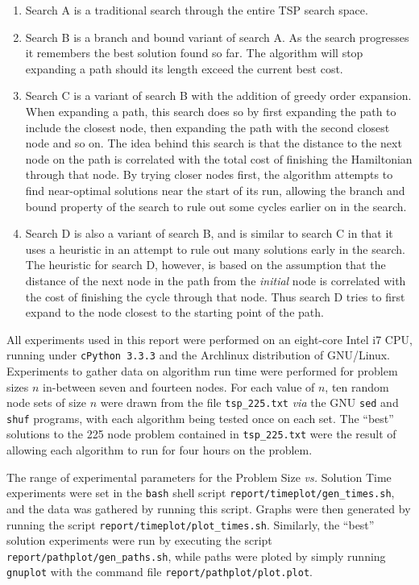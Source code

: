 \documentclass{article}
\begin{document}
\begin{enumerate}
	\item Search A is a traditional search through the entire TSP search space.
	\item Search B is a branch and bound variant of search A. As the search progresses it remembers the best solution found so far. The algorithm will stop expanding a path should its length exceed the current best cost.
	\item Search C is a variant of search B with the addition of greedy order expansion. When expanding a path, this search does so by first expanding the path to include the closest node, then expanding the path with the second closest node and so on. The idea behind this search is that the distance to the next node on the path is correlated with the total cost of finishing the Hamiltonian through that node. By trying closer nodes first, the algorithm attempts to find near-optimal solutions near the start of its run, allowing the branch and bound property of the search to rule out some cycles earlier on in the search.
	\item Search D is also a variant of search B, and is similar to search C in that it uses a heuristic in an attempt to rule out many solutions early in the search. The heuristic for search D, however, is based on the assumption that the distance of the next node in the path from the {\it initial} node is correlated with the cost of finishing the cycle through that node. Thus search D tries to first expand to the node closest to the starting point of the path.
\end{enumerate}


All experiments used in this report were performed on an eight-core Intel i7 CPU, running under {\tt cPython 3.3.3} and the Archlinux distribution of GNU/Linux. \\

Experiments to gather data on algorithm run time were performed for problem sizes \(n\) in-between seven and fourteen nodes. For each value of \(n\), ten random node sets of size \(n\) were drawn from the file {\tt tsp\_225.txt} {\it via} the GNU {\tt sed} and {\tt shuf} programs, with each algorithm being tested once on each set.  The ``best'' solutions to the 225 node problem contained in {\tt tsp\_225.txt} were the result of allowing each algorithm to run for four hours on the problem.

The range of experimental parameters for the Problem Size {\it vs.} Solution Time experiments were set in the {\tt bash} shell script {\tt report/timeplot/gen\_times.sh}, and the data was gathered by running this script. Graphs were then generated by running the script {\tt report/timeplot/plot\_times.sh}. Similarly, the ``best'' solution experiments were run by executing the script {\tt report/pathplot/gen\_paths.sh}, while paths were ploted by simply running {\tt gnuplot} with the command file {\tt report/pathplot/plot.plot}.
\end{document}
